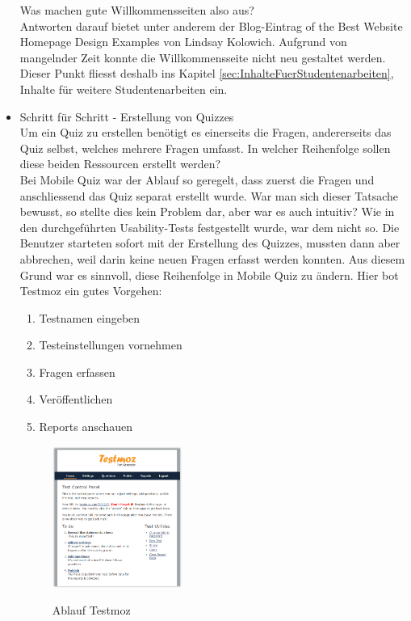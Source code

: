 \begin{itemize}
		Was machen gute Willkommensseiten also aus? \\
		Antworten darauf bietet unter anderem der Blog-Eintrag  of the Best Website Homepage Design Examples\grqq \cite{hubspot_kolowich} von Lindsay Kolowich.
		Aufgrund von mangelnder Zeit konnte die Willkommensseite nicht neu gestaltet werden. Dieser Punkt fliesst deshalb ins Kapitel \ref{sec:InhalteFuerStudentenarbeiten}, Inhalte für weitere Studentenarbeiten ein.
		
		
		\item Schritt für Schritt - Erstellung von Quizzes \\
		Um ein Quiz zu erstellen benötigt es einerseits die Fragen, andererseits das Quiz selbst, welches mehrere Fragen umfasst. In welcher Reihenfolge sollen diese beiden Ressourcen erstellt werden? \\
		Bei Mobile Quiz war der Ablauf so geregelt, dass zuerst die Fragen und anschliessend das Quiz separat erstellt wurde. War man sich dieser Tatsache bewusst, so stellte dies kein Problem dar, aber war es auch intuitiv? Wie in den durchgeführten Usability-Tests festgestellt wurde, war dem nicht so. Die Benutzer starteten sofort mit der Erstellung des Quizzes, mussten dann aber abbrechen, weil darin keine neuen Fragen erfasst werden konnten.
		Aus diesem Grund war es sinnvoll, diese Reihenfolge in Mobile Quiz zu ändern. Hier bot Testmoz \cite{testmoz.com} ein gutes Vorgehen:
		
		\begin{enumerate}
			\item Testnamen eingeben
			\item Testeinstellungen vornehmen
			\item Fragen erfassen
			\item Veröffentlichen
			\item Reports anschauen
		\end{enumerate}
		
		\begin{figure}[H]
			\centering
			\includegraphics[width=0.4\textwidth]{Images/Testmoz2.PNG}
			\caption{Ablauf Testmoz}
			\cite{testmoz.com}
		\end{figure}
		

\end{itemize}
